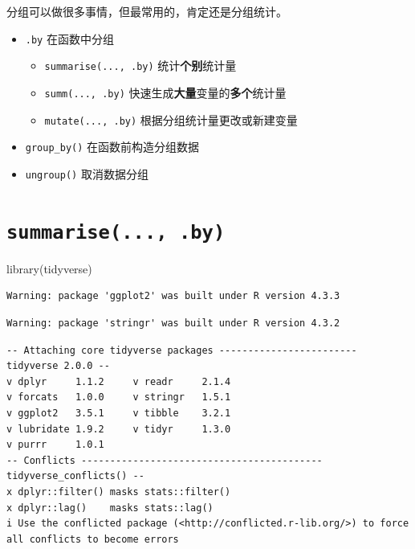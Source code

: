 \documentclass[
  letterpaper,
]{ctexbook}
\newenvironment{Shaded}{\begin{snugshade}}{\end{snugshade}}
\newcommand{\FunctionTok}[1]{\textcolor[rgb]{0.28,0.35,0.67}{#1}}
\newcommand{\NormalTok}[1]{\textcolor[rgb]{0.00,0.23,0.31}{#1}}
\providecommand{\tightlist}{%
  \setlength{\itemsep}{0pt}\setlength{\parskip}{0pt}}\usepackage{longtable,booktabs,array}
\begin{document}
分组可以做很多事情，但最常用的，肯定还是分组统计。

\begin{itemize}
\tightlist
\item
  \texttt{.by} 在函数中分组

  \begin{itemize}
  \tightlist
  \item
    \texttt{summarise(...,\ .by)} 统计{\textbf{个别}}统计量
  \item
    \texttt{summ(...,\ .by)}
    快速生成{\textbf{大量}}变量的{\textbf{多个}}统计量
  \item
    \texttt{mutate(...,\ .by)} 根据分组统计量更改或新建变量
  \end{itemize}
\item
  \texttt{group\_by()} 在函数前构造分组数据
\item
  \texttt{ungroup()} 取消数据分组
\end{itemize}

\hypertarget{summarise...-.by}{%
\section{\texorpdfstring{\texttt{summarise(...,\ .by)}}{summarise(..., .by)}}\label{summarise...-.by}}

\begin{Shaded}
\begin{Highlighting}[]
\FunctionTok{library}\NormalTok{(tidyverse)}
\end{Highlighting}
\end{Shaded}

\begin{verbatim}
Warning: package 'ggplot2' was built under R version 4.3.3
\end{verbatim}

\begin{verbatim}
Warning: package 'stringr' was built under R version 4.3.2
\end{verbatim}

\begin{verbatim}
-- Attaching core tidyverse packages ------------------------ tidyverse 2.0.0 --
v dplyr     1.1.2     v readr     2.1.4
v forcats   1.0.0     v stringr   1.5.1
v ggplot2   3.5.1     v tibble    3.2.1
v lubridate 1.9.2     v tidyr     1.3.0
v purrr     1.0.1     
-- Conflicts ------------------------------------------ tidyverse_conflicts() --
x dplyr::filter() masks stats::filter()
x dplyr::lag()    masks stats::lag()
i Use the conflicted package (<http://conflicted.r-lib.org/>) to force all conflicts to become errors
\end{verbatim}
\end{document}
